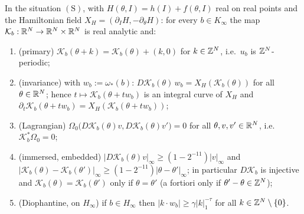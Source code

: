\begin{theorem}\label{bpP:p11a:limit-torus}
In the situation $(\mathrm S)$, with $H(\theta,I)=h(I)+f(\theta,I)$ real on real points and the Hamiltonian field $X_H=(\partial_IH,-\partial_\theta H)$: for every $b\in K_\infty$ the map $\mathcal K_b:\mathbb{R}^N\to\mathbb{R}^N\times\mathbb{R}^N$ is real analytic and:
\begin{enumerate}[label=(\alph*)]
\item (primary) $\mathcal K_b(\theta+k)=\mathcal K_b(\theta)+(k,0)$ for $k\in\mathbb{Z}^N$, i.e.\ $u_b$ is $\mathbb{Z}^N$-periodic;
\item (invariance) with $w_b:=\omega_*(b)$: $D\mathcal K_b(\theta)\,w_b=X_H(\mathcal K_b(\theta))$ for all $\theta\in\mathbb{R}^N$; hence $t\mapsto\mathcal K_b(\theta+tw_b)$ is an integral curve of $X_H$ and $\partial_t\mathcal K_b(\theta+tw_b)=X_H(\mathcal K_b(\theta+tw_b))$;
\item (Lagrangian) $\Omega_0\bigl(D\mathcal K_b(\theta)v,D\mathcal K_b(\theta)v'\bigr)=0$ for all $\theta,v,v'\in\mathbb{R}^N$, i.e.\ $\mathcal K_b^*\Omega_0=0$;
\item (immersed, embedded) $\lvert D\mathcal K_b(\theta)v\rvert_\infty\ge(1-2^{-11})\lvert v\rvert_\infty$ and $\lvert\mathcal K_b(\theta)-\mathcal K_b(\theta')\rvert_\infty\ge(1-2^{-11})\lvert\theta-\theta'\rvert_\infty$; in particular $D\mathcal K_b$ is injective and $\mathcal K_b(\theta)=\mathcal K_b(\theta')$ only if $\theta=\theta'$ (a fortiori only if $\theta'-\theta\in\mathbb{Z}^N$);
\item (Diophantine, on $H_\infty$) if $b\in H_\infty$ then $\lvert k\cdot w_b\rvert\ge\gamma\lvert k\rvert_1^{-\tau}$ for all $k\in\mathbb{Z}^N\setminus\{0\}$.
\end{enumerate}
\end{theorem}
